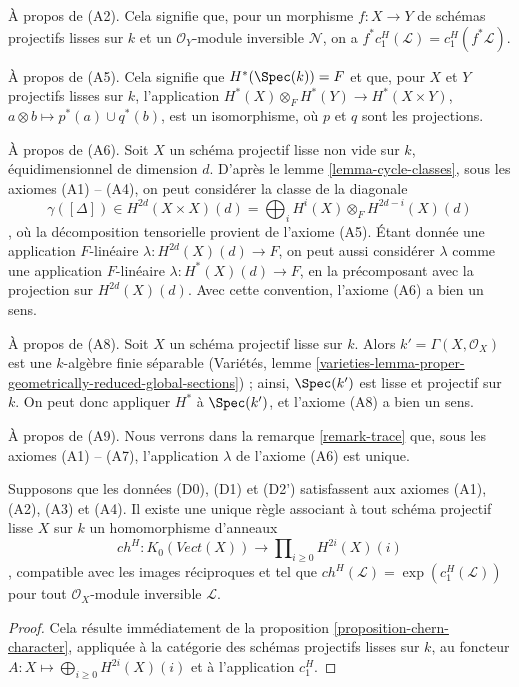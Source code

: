 \medskip\noindent
À propos de (A2). Cela signifie que, pour un morphisme $f : X \to Y$ de schémas projectifs
lisses sur $k$ et un $\mathcal{O}_Y$-module inversible $\mathcal{N}$,
on a $f^*c_1^H(\mathcal{L}) = c_1^H(f^*\mathcal{L})$.

\medskip\noindent
À propos de (A5). Cela signifie que $H^*(\Spec(k)) = F$ et que, pour $X$ et $Y$ projectifs
lisses sur $k$, l'application $H^*(X) \otimes_F H^*(Y) \to H^*(X \times Y)$,
$a \otimes b \mapsto p^*(a) \cup q^*(b)$, est un isomorphisme,
où $p$ et $q$ sont les projections.

\medskip\noindent
À propos de (A6). Soit $X$ un schéma projectif lisse non vide sur $k$,
équidimensionnel de dimension $d$. D'après le lemme \ref{lemma-cycle-classes},
sous les axiomes (A1) -- (A4), on peut considérer la classe de la diagonale
$$
\gamma([\Delta]) \in
H^{2d}(X \times X)(d) = \bigoplus\nolimits_i H^i(X) \otimes_F H^{2d - i}(X)(d)
$$,
où la décomposition tensorielle provient de l'axiome (A5).
Étant donnée une application $F$-linéaire $\lambda : H^{2d}(X)(d) \to F$, on peut aussi considérer
$\lambda$ comme une application $F$-linéaire $\lambda : H^*(X)(d) \to F$, en la précomposant
avec la projection sur $H^{2d}(X)(d)$. Avec cette convention, l'axiome (A6)
a bien un sens.

\medskip\noindent
À propos de (A8). Soit $X$ un schéma projectif lisse sur $k$.
Alors $k' = \Gamma(X, \mathcal{O}_X)$ est une
$k$-algèbre finie séparable (Variétés, lemme
\ref{varieties-lemma-proper-geometrically-reduced-global-sections}) ;
ainsi, $\Spec(k')$ est lisse et projectif sur $k$.
On peut donc appliquer $H^*$ à $\Spec(k')$, et l'axiome (A8) a bien un sens.

\medskip\noindent
À propos de (A9). Nous verrons dans la remarque \ref{remark-trace} que, sous
les axiomes (A1) -- (A7), l'application $\lambda$ de l'axiome (A6) est unique.

\begin{lemma}
\label{lemma-chern-classes}
Supposons que les données (D0), (D1) et (D2') satisfassent aux axiomes (A1), (A2), (A3) et (A4).
Il existe une unique règle associant à tout schéma projectif lisse $X$ sur $k$
un homomorphisme d'anneaux
$$
ch^H :
K_0(\textit{Vect}(X))
\longrightarrow
\prod\nolimits_{i \geq 0} H^{2i}(X)(i)
$$,
compatible avec les images réciproques et tel que
$ch^H(\mathcal{L}) = \exp(c_1^H(\mathcal{L}))$
pour tout $\mathcal{O}_X$-module inversible $\mathcal{L}$.
\end{lemma}

\begin{proof}
Cela résulte immédiatement de la proposition \ref{proposition-chern-character},
appliquée à la catégorie des schémas projectifs lisses sur $k$,
au foncteur $A : X \mapsto \bigoplus_{i \geq 0} H^{2i}(X)(i)$
et à l'application $c_1^H$.
\end{proof}

